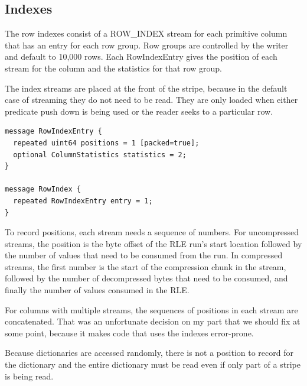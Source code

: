 \documentclass{article}
\begin{document}
\subsection{Indexes}

The row indexes consist of a ROW\_INDEX stream for each primitive
column that has an entry for each row group. Row groups are controlled
by the writer and default to 10,000 rows. Each RowIndexEntry gives the
position of each stream for the column and the statistics for that row
group.

The index streams are placed at the front of the stripe, because in
the default case of streaming they do not need to be read. They are
only loaded when either predicate push down is being used or the
reader seeks to a particular row.

\begin{verbatim}
message RowIndexEntry {
  repeated uint64 positions = 1 [packed=true];
  optional ColumnStatistics statistics = 2;
}

message RowIndex {
  repeated RowIndexEntry entry = 1;
}
\end{verbatim}

To record positions, each stream needs a sequence of numbers. For
uncompressed streams, the position is the byte offset of the RLE run's
start location followed by the number of values that need to be
consumed from the run. In compressed streams, the first number is the
start of the compression chunk in the stream, followed by the number
of decompressed bytes that need to be consumed, and finally the number
of values consumed in the RLE.

For columns with multiple streams, the sequences of positions in each
stream are concatenated. That was an unfortunate decision on my part
that we should fix at some point, because it makes code that uses the
indexes error-prone.

Because dictionaries are accessed randomly, there is not a position to
record for the dictionary and the entire dictionary must be read even
if only part of a stripe is being read.
\end{document}
